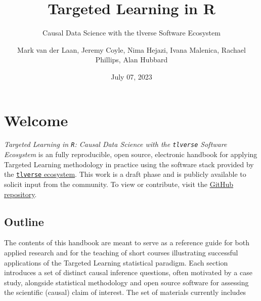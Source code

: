 \documentclass[
  12pt, krantz2,
]{krantz}
\title{Targeted Learning in R}
\subtitle{Causal Data Science with the tlverse Software Ecosystem}
\author{Mark van der Laan, Jeremy Coyle, Nima Hejazi, Ivana Malenica, Rachael Phillips, Alan Hubbard}
\date{July 07, 2023}
\newcommand{\passthrough}[1]{#1}
\newcommand{\1}{\mathbbm{1}}
\theoremstyle{definition}
\theoremstyle{definition}
\theoremstyle{definition}
\theoremstyle{definition}
\theoremstyle{remark}
\begin{document}
\maketitle


\thispagestyle{empty}

\begin{center}
\end{center}

\setlength{\abovedisplayskip}{-5pt}
\setlength{\abovedisplayshortskip}{-5pt}

\mainmatter

{
\hypersetup{linkcolor=}
\setcounter{tocdepth}{3}
\tableofcontents
}
\listoffigures
\hypertarget{welcome}{%
\chapter*{Welcome}\label{welcome}}


\emph{Targeted Learning in \passthrough{\lstinline!R!}: Causal Data Science with the \passthrough{\lstinline!tlverse!} Software
Ecosystem} is an fully reproducible, open source, electronic handbook for
applying Targeted Learning methodology in practice using the software stack
provided by the \href{https://github.com/tlverse}{\passthrough{\lstinline!tlverse!} ecosystem}. This work is
a draft phase and is publicly available to solicit input from the community. To
view or contribute, visit the \href{https://github.com/tlverse/tlverse-handbook}{GitHub
repository}.

\hypertarget{outline}{%
\section*{Outline}\label{outline}}


The contents of this handbook are meant to serve as a reference guide for both
applied research and for the teaching of short courses illustrating successful
applications of the Targeted Learning statistical paradigm. Each section
introduces a set of distinct causal inference questions, often motivated by a
case study, alongside statistical methodology and open source software for
assessing the scientific (causal) claim of interest. The set of materials
currently includes
\end{document}
